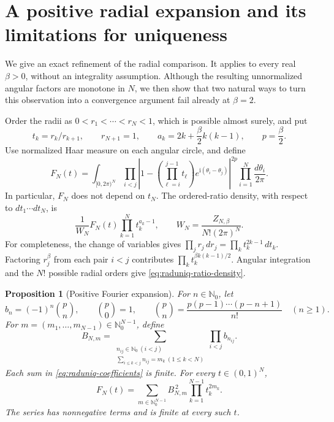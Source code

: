 \documentclass[11pt,a4paper]{article}
\numberwithin{equation}{section}
\newtheorem{proposition}[theorem]{Proposition}
\theoremstyle{definition}
\theoremstyle{remark}
\begin{document}
\section{A positive radial expansion and its limitations for uniqueness}

We give an exact refinement of the radial comparison. It applies to every
real $\beta>0$, without an integrality assumption. Although the resulting
unnormalized angular factors are monotone in $N$, we then show that two
natural ways to turn this observation into a convergence argument fail
already at $\beta=2$.

Order the radii as $0<r_1<\cdots<r_N<1$, which is possible almost surely,
and put
\[
 t_k=r_k/r_{k+1},\qquad r_{N+1}=1,\qquad
 a_k=2k+\frac\beta2k(k-1),\qquad p=\frac\beta2.
\]
Use normalized Haar measure on each angular circle, and define
\begin{equation}\label{eq:raduniq-angular}
 F_N(t)=\int_{[0,2\pi)^N}
 \prod_{i<j}\left|1-
 \left(\prod_{\ell=i}^{j-1}t_\ell\right)
 e^{\mathrm i(\theta_i-\theta_j)}\right|^{2p}
 \prod_{i=1}^N\frac{d\theta_i}{2\pi}.
\end{equation}
In particular, $F_N$ does not depend on $t_N$. The ordered-ratio density,
with respect to $dt_1\cdots dt_N$, is
\begin{equation}\label{eq:raduniq-ratio-density}
 \frac1{W_N}F_N(t)\prod_{k=1}^N t_k^{a_k-1},\qquad
 W_N=\frac{Z_{N,\beta}}{N!(2\pi)^N}.
\end{equation}
For completeness, the change of variables gives
$\prod_j r_j\,dr_j=\prod_k t_k^{2k-1}\,dt_k$.
Factoring $r_j^\beta$ from each pair $i<j$ contributes
$\prod_k t_k^{\beta k(k-1)/2}$. Angular integration and the $N!$
possible radial orders give \eqref{eq:raduniq-ratio-density}.

\begin{proposition}[Positive Fourier expansion]\label{prop:raduniq-positive}
For $n\in\mathbb N_0$, let
\[
 b_n=(-1)^n\binom pn,
 \qquad
 \binom p0=1,\qquad
 \binom pn=\frac{p(p-1)\cdots(p-n+1)}{n!}\quad(n\ge1).
\]
For $m=(m_1,\ldots,m_{N-1})\in\mathbb N_0^{N-1}$, define
\begin{equation}\label{eq:raduniq-coefficients}
 B_{N,m}=
 \sum_{\substack{n_{ij}\in\mathbb N_0\ (i<j)\\
       \sum_{i\le k<j}n_{ij}=m_k\ (1\le k<N)}}
       \prod_{i<j}b_{n_{ij}}.
\end{equation}
Each sum in \eqref{eq:raduniq-coefficients} is finite. For every
$t\in(0,1)^N$,
\begin{equation}\label{eq:raduniq-positive-series}
 F_N(t)=\sum_{m\in\mathbb N_0^{N-1}}
            B_{N,m}^{\,2}\prod_{k=1}^{N-1}t_k^{2m_k}.
\end{equation}
The series has nonnegative terms and is finite at every such $t$.
\end{proposition}
\end{document}
